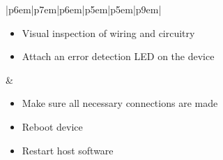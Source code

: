 \documentclass{article}
\begin{document}
\begin{table}[H]
\begin{tabular}{|p{6em}|p{7em}|p{6em}|p{5em}|p{5em}|p{9em}|}
\begin{minipage}[t]{\linewidth}
\begin{itemize}[nosep, wide=0pt, leftmargin=*, after=\strut]
					\item Visual inspection of wiring and circuitry
					\item Attach an error detection LED on the device
				\end{itemize}
			\end{minipage}                                                                                  &
			\begin{minipage}[t]{\linewidth}
				\begin{itemize}[nosep, wide=0pt, leftmargin=*, after=\strut]
					\item Make sure all necessary connections are made
					\item Reboot device
					\item Restart host software
				\end{itemize}
			\end{minipage}
			\tabularnewline{}
		\end{tabular}
	\caption{\label{tab:DeviceManager}Device Manager FMEA \\\hspace{0.1\textwidth} \textbf{Req:} \hyperref[SR1]{SR1},\hyperref[SR2]{SR2}}
	\end{table}
	
\end{document}
